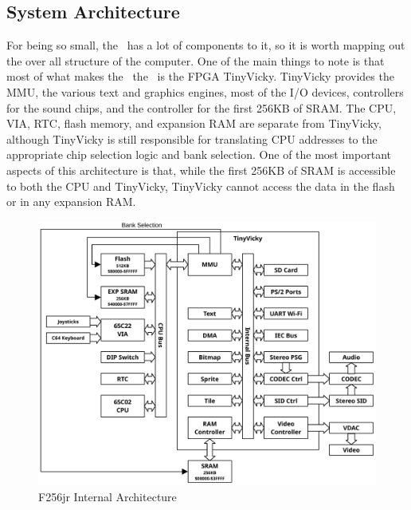 \subsection*{System Architecture}

For being so small, the \jr\ has a lot of components to it, so it is worth mapping out the over all structure of the computer. One of the main things to note is that most of what makes the \jr\ the \jr\ is the FPGA TinyVicky. TinyVicky provides the MMU, the various text and graphics engines, most of the I/O devices, controllers for the sound chips, and the controller for the first 256KB of SRAM. The CPU, VIA, RTC, flash memory, and expansion RAM are separate from TinyVicky, although TinyVicky is still responsible for translating CPU addresses to the appropriate chip selection logic and bank selection. One of the most important aspects of this architecture is that, while the first 256KB of SRAM is accessible to both the CPU and TinyVicky, TinyVicky cannot access the data in the flash or in any expansion RAM.

\begin{figure}[ht]
    \begin{center}
        \includegraphics[scale=0.80]{images/f256jr_layout.pdf}
    \end{center}
    \caption{F256jr Internal Architecture}
    \label{fig:arch}
\end{figure}

